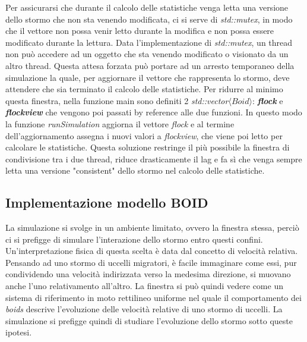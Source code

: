 \documentclass{article}
\begin{document}
Per assicurarsi che durante il calcolo delle statistiche venga letta una 
versione dello stormo che non sta venendo modificata, ci si serve di \textit
{std::mutex}, in modo che il vettore non possa venir letto durante la modifica e
non possa essere modificato durante la lettura. Data l'implementazione di 
\textit{std::mutex}, un thread non può accedere ad un oggetto che sta venendo 
modificato o visionato da un altro thread. Questa attesa forzata può portare ad 
un arresto temporaneo della simulazione la quale, per aggiornare il vettore che 
rappresenta lo stormo, deve attendere che sia terminato il calcolo delle 
statistiche. Per ridurre al minimo questa finestra, nella funzione main sono 
definiti 2 \textit{std::vector$\langle Boid\rangle$}: \textbf{\textit{flock}} e 
\textbf{\textit{flock\textunderscore}\textit{view}} che vengono poi passati by 
reference alle due funzioni. In questo modo la funzione \textit{runSimulation} 
aggiorna il vettore \textit{flock} e al termine dell'aggiornamento assegna i 
nuovi valori a \textit{flock\textunderscore}\textit{view}, che viene poi letto 
per calcolare le statistiche. Questa soluzione restringe il più possibile la 
finestra di condivisione tra i due thread, riduce drasticamente il lag e fa sì 
che venga sempre letta una versione "consistent" dello stormo nel calcolo delle 
statistiche.

\subsection{Implementazione modello BOID}
La simulazione si svolge in un ambiente limitato, ovvero la finestra stessa, 
perciò ci si prefigge di simulare l'interazione dello stormo entro questi 
confini. Un'interpretazione fisica di questa scelta è data dal concetto di 
velocità relativa. Pensando ad uno stormo di uccelli migratori, è facile 
immaginare come essi, pur condividendo una velocità indirizzata verso la 
medesima direzione, si muovano anche l'uno relativamento all'altro. La finestra 
si può quindi vedere come un sistema di riferimento in moto rettilineo uniforme 
nel quale il comportamento dei \textit{boids} descrive l'evoluzione delle 
velocità relative di uno stormo di uccelli. La simulazione si prefigge quindi di
studiare l'evoluzione dello stormo sotto queste ipotesi. 
\end{document}
